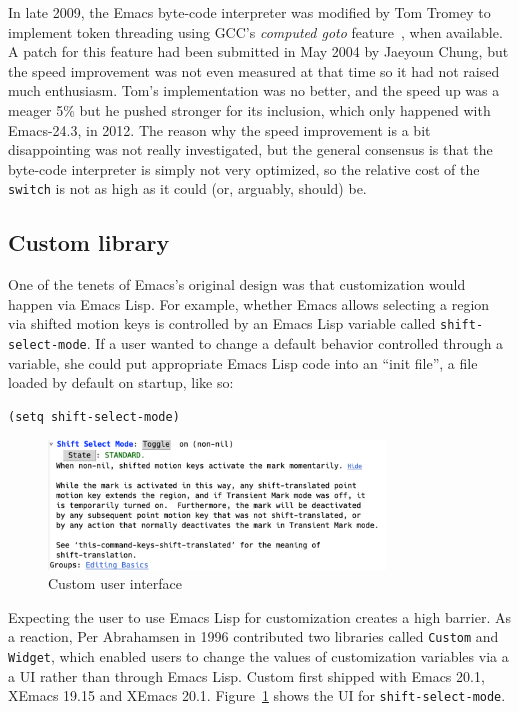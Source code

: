 \documentclass[format=acmsmall, review]{acmart}
\newcommand \Elisp {Emacs Lisp}
\begin{document}
In late 2009, the Emacs byte-code interpreter was modified by Tom Tromey to
implement token threading using GCC's \emph{computed goto} feature~\cite{ComputedGOTO}, when
available.  A patch for this feature had been submitted in May 2004 by
Jaeyoun Chung, but the speed improvement was not even measured at that time
so it had not raised much enthusiasm.  Tom's implementation was no better,
and the speed up was a meager 5\% but he pushed stronger for its inclusion,
which only happened with Emacs-24.3, in 2012.  The reason why the speed
improvement is a bit disappointing was not really investigated, but the
general consensus is that the byte-code interpreter is simply not very
optimized, so the relative cost of the \texttt{switch} is not as high as it
could (or, arguably, should) be.

\subsection{Custom library}
\label{sec:custom}

One of the tenets of Emacs's original design was that customization
would happen via \Elisp.  For example, whether Emacs allows selecting
a region via shifted motion keys is controlled by an \Elisp{} variable
called \texttt{shift-select-mode}.  If a user wanted to change a default
behavior controlled through a variable, she could put appropriate
\Elisp{} code into an ``init file'', a file loaded by default on
startup, like so:
%
\begin{verbatim}
(setq shift-select-mode)
\end{verbatim}
%
\begin{figure}[tb]
  \centering
  \includegraphics[width=0.8\textwidth]{custom}  
  \caption{Custom user interface}
  \label{fig:custom}
\end{figure}
%
Expecting the user to use \Elisp{} for customization creates a high
barrier.  As a reaction, Per Abrahamsen in 1996 contributed two
libraries called \texttt{Custom} and \texttt{Widget}, which enabled
users to change the values of customization variables via a a UI
rather than through \Elisp{}.  Custom first shipped with Emacs 20.1, XEmacs
19.15 and XEmacs 20.1.  Figure~\ref{fig:custom} shows the UI
for \texttt{shift-select-mode}.
\end{document}

